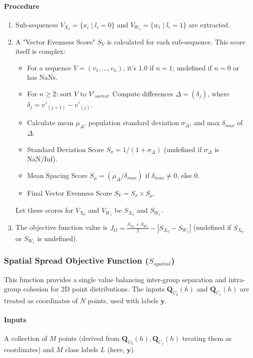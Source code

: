 \documentclass[conference]{IEEEtran} %
\newcommand{\vecbf}[1]{\bm{#1}} %
\begin{document}
\paragraph{Procedure}
\begin{enumerate}
    \item Sub-sequences $V_{X_0} = \{x_i \mid l_i=0\}$ and $V_{W_1} = \{w_i \mid l_i=1\}$ are extracted.
    \item A "Vector Evenness Score" $S_V$ is calculated for each sub-sequence. This score itself is complex:
    \begin{itemize}
        \item For a sequence $V=(v_1, \dots, v_n)$, it's $1.0$ if $n=1$; undefined if $n=0$ or has NaNs.
        \item For $n \ge 2$: sort $V$ to $V'_{sorted}$. Compute differences $\Delta = (\delta_j)$, where $\delta_j = v'_{(j+1)} - v'_{(j)}$.
        \item Calculate mean $\mu_{\Delta}$, population standard deviation $\sigma_{\Delta}$, and max $\delta_{max}$ of $\Delta$.
        \item Standard Deviation Score $S_{\sigma} = 1 / (1 + \sigma_{\Delta})$ (undefined if $\sigma_{\Delta}$ is NaN/Inf).
        \item Mean Spacing Score $S_{\mu} = (\mu_{\Delta}/\delta_{max})$ if $\delta_{max} \neq 0$, else $0$.
        \item Final Vector Evenness Score $S_V = S_{\sigma} \times S_{\mu}$.
    \end{itemize}
    Let these scores for $V_{X_0}$ and $V_{W_1}$ be $S_{X_0}$ and $S_{W_1}$.
    \item The objective function value is $J_O = \frac{S_{X_0} + S_{W_1}}{2} - |S_{X_0} - S_{W_1}|$ (undefined if $S_{X_0}$ or $S_{W_1}$ is undefined).
\end{enumerate}

\subsubsection{Spatial Spread Objective Function ($S_{spatial}$)}
This function provides a single value balancing inter-group separation and intra-group cohesion for 2D point distributions. The inputs $\vecbf{Q}_{C_0}(h)$ and $\vecbf{Q}_{C_1}(h)$ are treated as coordinates of $N$ points, used with labels $\vecbf{y}$.
\paragraph{Inputs} A collection of $M$ points (derived from $\vecbf{Q}_{C_0}(h), \vecbf{Q}_{C_1}(h)$ treating them as coordinates) and $M$ class labels $L$ (here, $\vecbf{y}$).
\end{document}
